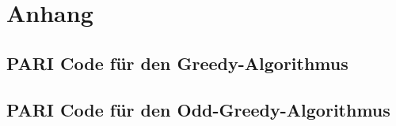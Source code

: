 \section{Anhang}
\subsection{PARI Code für den Greedy-Algorithmus}\label{code:greedy}

\subsection{PARI Code für den Odd-Greedy-Algorithmus}\label{code:odd_greedy}
